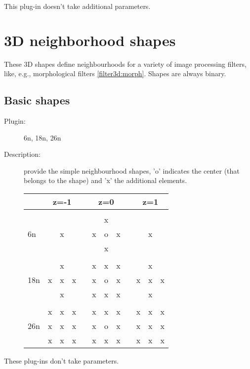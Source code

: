    This plug-in doesn't take additional parameters. 

\section{3D neighborhood shapes}  \label{sec:3dshapes}
  
  These 3D shapes define neighbourhoods for a variety of image processing filters, 
  like, e.g., morphological filters \ref{filter3d:morph}. 
  Shapes are always binary. 
  

  \subsection{Basic shapes}
  \label{shapes3d:basic}

  \begin{description}

   \item [Plugin:] 6n, 18n, 26n 
   \item [Description:] provide the simple neighbourhood shapes, 'o' indicates the center (that belongs to the shape) 
       and 'x' the additional elements. 

     \begin{tabular}{|l|c|c|c|c|c|c|c|c|c|c|c|}
     \hline 
      & \multicolumn{3}{|c|}{z=-1} &&  \multicolumn{3}{|c|}{z=0}  && \multicolumn{3}{|c|}{z=1}\\
     \hline 
     \multicolumn{12}{|c|}{}\\
     \hline 
     \multirow{3}{*}{6n}
     &   &   &   &&   & x &   &&  &   &   \\
     \cline{2-4}     \cline{6-8}      \cline{10-12}
     &   & x &   && x & o & x &&  & x &   \\
     \cline{2-4}     \cline{6-8}      \cline{10-12}
     &   &   &   &&   & x &   &&  &   &   \\
     \hline 
     \multicolumn{12}{|c|}{}\\
     \hline 
     \multirow{3}{*}{18n}
     &   & x &   && x & x & x &&   & x &    \\
     \cline{2-4}     \cline{6-8}      \cline{10-12}
     & x & x & x && x & o & x && x & x & x  \\
     \cline{2-4}     \cline{6-8}      \cline{10-12}
     &   & x &   && x & x & x &&   & x &    \\
     \hline 
     \multicolumn{12}{|c|}{}\\
     \hline 
     \multirow{3}{*}{26n}
     & x & x & x && x & x & x && x & x & x  \\
     \cline{2-4}     \cline{6-8}      \cline{10-12}
     & x & x & x && x & o & x && x & x & x  \\
     \cline{2-4}     \cline{6-8}      \cline{10-12}
     & x & x & x && x & x & x && x & x & x  \\
     \hline
     \end{tabular}
   
   \end{description}
   These plug-ins don't take parameters. 
   



